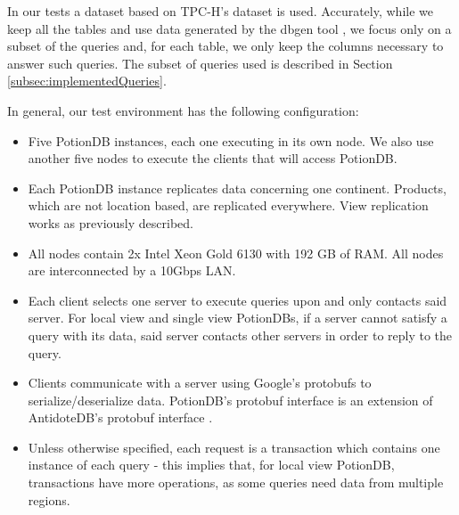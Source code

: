 \documentclass{vldb}
\begin{document}
In our tests a dataset based on TPC-H's dataset \cite{tpch} is used.
Accurately, while we keep all the tables and use data generated by the dbgen tool \cite{tpch}, we focus only on a subset of the queries and, for each table, we only keep the columns necessary to answer such queries.
The subset of queries used is described in Section \ref{subsec:implementedQueries}.


In general, our test environment has the following configuration:

\begin{itemize}
	\item Five PotionDB instances, each one executing in its own node. We also use another five nodes to execute the clients that will access PotionDB.
	\item Each PotionDB instance replicates data concerning one continent.
	Products, which are not location based, are replicated everywhere.
	View replication works as previously described.
	\item All nodes contain 2x Intel Xeon Gold 6130 with 192 GB of RAM. All nodes are interconnected by a 10Gbps LAN.
	\item Each client selects one server to execute queries upon and only contacts said server. For local view and single view PotionDBs, if a server cannot satisfy a query with its data, said server contacts other servers in order to reply to the query.
	\item Clients communicate with a server using Google’s protobufs \cite{Protobufs} to serialize/deserialize data. PotionDB’s protobuf interface is an extension of AntidoteDB’s protobuf interface \cite{AntidoteDB}.
	\item Unless otherwise specified, each request is a transaction which contains one instance of each query - this implies that, for local view PotionDB, transactions have more operations, as some queries need data from multiple regions.

\end{itemize}
\end{document}

